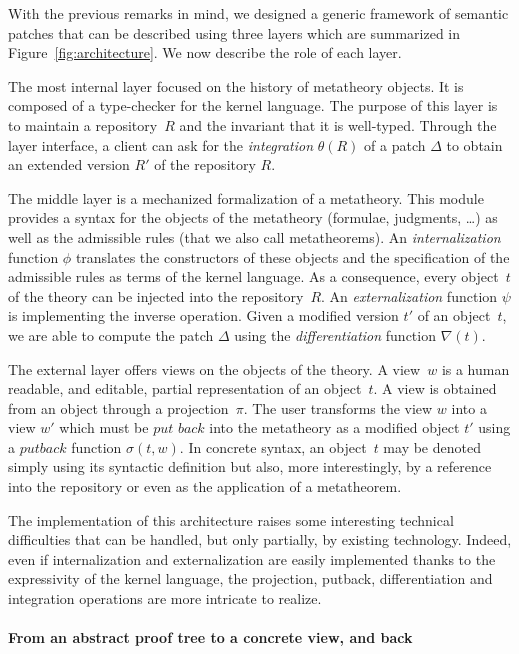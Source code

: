 \documentclass{article}
\newcommand{\remtext}[1]{}
\begin{document}
With the previous remarks in mind, we designed a generic framework of semantic
patches that can be described using three layers which are summarized in 
Figure~\ref{fig:architecture}. We now describe the role of each layer.

The most internal layer focused on the history of metatheory
objects. It is composed of a type-checker for the kernel language. The
purpose of this layer is to maintain a repository~$R$ and the
invariant that it is well-typed. Through the layer interface, a client
can ask for the \textit{integration} $\theta(R)$ of a patch $\Delta$
to obtain an extended version $R'$ of the repository $R$.

The middle layer is a mechanized formalization of a metatheory. This
module provides a syntax for the objects of the metatheory (formulae,
judgments, \ldots) as well as the admissible rules (that we also call
metatheorems).  An \textit{internalization} function $\phi$ translates
the constructors of these objects and the specification of the
admissible rules as terms of the kernel language. As a consequence,
every object~$t$ of the theory can be injected into the
repository~$R$. An \textit{externalization} function $\psi$ is
implementing the inverse operation. Given a modified version $t'$ of
an object~$t$, we are able to compute the patch $\Delta$ using
the \textit{differentiation} function $\nabla(t)$. 

The external layer offers views on the objects of the theory. A
view~$w$ is a human readable, and editable, partial representation of
an object~$t$. A view is obtained from an object through a
projection~$\pi$.  The user transforms the view $w$ into a view $w'$
which must be $\textit{put back}$ into the metatheory as a modified
object $t'$ using a $\textit{putback}$ function $\sigma(t, w)$.  In
concrete syntax, an object~$t$ may be denoted simply using its
syntactic definition but also, more interestingly, by a reference into
the repository or even as the application of a metatheorem.

The implementation of this architecture raises some interesting
technical difficulties that can be handled, but only partially, 
by existing technology. Indeed, even if internalization and 
externalization are easily implemented thanks to the expressivity
of the kernel language, the projection, putback, differentiation
and integration operations are more intricate to realize. 

\paragraph{From an abstract proof tree to a concrete view, and back}
\-
\remtext{Fri Jun 18, 2010  1:36 PM. Un arbre de preuves, ce n'est
  pas très pratique. Pourtant, c'est moralement sur cet objet 
  que s'opère le développement et non sur le code source, qui
  n'en est qu'une représentation. On justifie la nécessité de
  projection et on fait référence aux lentilles de Pierce pour
  expliquer $\sigma$ et $\pi$.}
\end{document}
